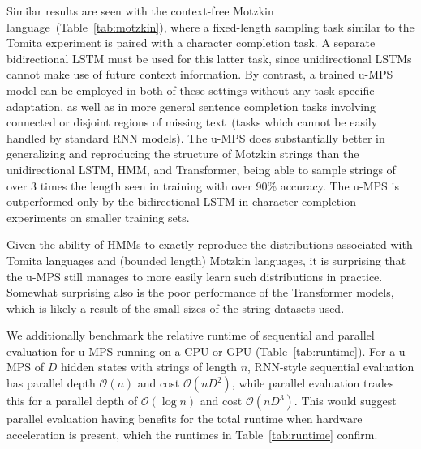 \documentclass[twoside]{article}
\begin{document}
Similar results are seen with the context-free Motzkin language~(Table~\ref{tab:motzkin}), where a fixed-length sampling task similar to the Tomita experiment is paired with a character completion task. A separate bidirectional LSTM must be used for this latter task, since unidirectional LSTMs cannot make use of future context information. By contrast, a trained u-MPS model can be employed in both of these settings without any task-specific adaptation, as well as in more general sentence completion tasks involving connected or disjoint regions of missing text~(tasks which cannot be easily handled by standard RNN models). The u-MPS does substantially better in generalizing and reproducing the structure of Motzkin strings than the unidirectional LSTM, HMM, and Transformer, being able to sample strings of over 3 times the length seen in training with over 90\% accuracy. The u-MPS is outperformed only by the bidirectional LSTM in character completion experiments on smaller training sets.

Given the ability of HMMs to exactly reproduce the distributions associated with Tomita languages and (bounded length) Motzkin languages, it is surprising that the u-MPS still manages to more easily learn such distributions in practice. Somewhat surprising also is the poor performance of the Transformer models, which is likely a result of the small sizes of the string datasets used.

We additionally benchmark the relative runtime of sequential and parallel evaluation for u-MPS running on a CPU or GPU (Table~\ref{tab:runtime}). For a u-MPS of $D$ hidden states with strings of length $n$, RNN-style sequential evaluation has parallel depth $\mathcal{O}(n)$ and cost $\mathcal{O}(nD^2)$, while parallel evaluation trades this for a parallel depth of $\mathcal{O}(\log n)$ and cost $\mathcal{O}(nD^3)$. This would suggest parallel evaluation having benefits for the total runtime when hardware acceleration is present, which the runtimes in Table~\ref{tab:runtime} confirm.
\end{document}
